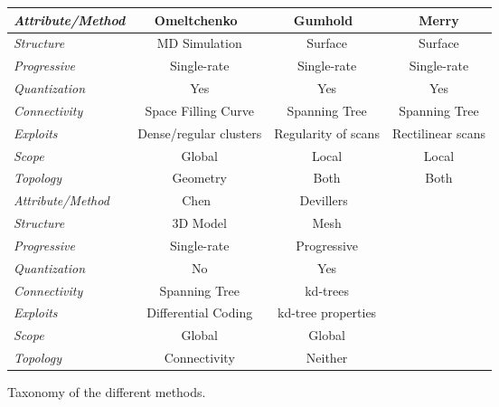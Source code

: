 \documentclass[11pt,twocolumn]{article}
\begin{document}
\begin{figure*}
\centering
\begin{tabular}{||l|c|c|c||}
  \hline

  \emph{Attribute/Method} & Omeltchenko~\cite{omeltchenko2000sls} &
  Gumhold~\cite{gumholdcomp} & Merry\cite{merrycomp} \\

  \hline

  \emph{Structure} & MD Simulation & Surface & Surface \\

  \emph{Progressive} & Single-rate & Single-rate & Single-rate \\

  \emph{Quantization} & Yes & Yes & Yes \\

  \emph{Connectivity} & Space Filling Curve & Spanning Tree & Spanning Tree \\

  \emph{Exploits} & Dense/regular clusters & Regularity of scans & Rectilinear
  scans \\

  \emph{Scope} & Global & Local & Local \\

  \emph{Topology} & Geometry & Both & Both \\

  \hline
  \hline

  \emph{Attribute/Method} & Chen~\cite{chen2005lcp} & Devillers~\cite{devillers2000gci} & \\

  \hline

  \emph{Structure} & 3D Model & Mesh & \\

  \emph{Progressive} & Single-rate & Progressive & \\

  \emph{Quantization} & No & Yes & \\

  \emph{Connectivity} & Spanning Tree & kd-trees & \\

  \emph{Exploits} & Differential Coding & kd-tree properties & \\

  \emph{Scope} & Global & Global & \\

  \emph{Topology} & Connectivity & Neither & \\

  \hline

\end{tabular}
\caption{Taxonomy of the different methods.}\label{fig:taxonomy}
\end{figure*}


\nocite{*}


\end{document}
